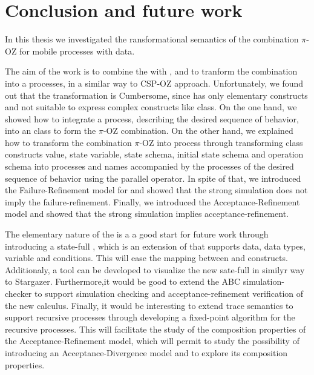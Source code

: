 \chapter{Conclusion and future work}
\label{sec_conclusion}
In this thesis we investigated the ransformational semantics of the combination $\pi$-OZ for mobile processes with data.

The aim of the work is to combine the \oz{} with \picalc{}, and to tranform the combination into a \picalc{} processes, in a similar way to CSP-OZ \cite{olderog} approach. Unfortunately, we found out that the transformation is Cumbersome, since \picalc{} has only elementary constructs and not suitable to express complex constructs like \oz{} class. On the one hand, we showed how to integrate a \picalc{} process, describing the desired sequence of behavior, into an \oz{} class to form the $\pi$-OZ combination. On the other hand, we explained how to transform the combination $\pi$-OZ into \picalc{} process through transforming \oz{} class constructs value, state variable, state schema, initial state schema and operation schema into \picalc{} processes and names accompanied by the processes of the desired sequence of behavior using the parallel operator. In spite of that, we introduced the Failure-Refinement model for \picalc{} and showed that the strong simulation does not imply the failure-refinement. Finally, we introduced the Acceptance-Refinement model and showed that the strong simulation implies acceptance-refinement. 

The elementary nature of the \picalc{} is a a good start for future work through introducing a state-full \picalc{}, which is an extension of \picalc{} that supports data, data types, variable and conditions. This will ease the mapping between \oz{} and \picalc{} constructs. Additionaly, a tool can be developed to visualize the new sate-full \picalc{} in similyr way to Stargazer\cite{stargazer}. Furthermore,it would be good to extend the ABC simulation-checker \cite{abc} to support simulation checking and acceptance-refinement verification of the new calculus. Finally, it would be interesting to extend \cite{gieseking} trace semantics to support recursive processes through developing a fixed-point algorithm for the recursive processes. This will facilitate the study of the composition properties of the Acceptance-Refinement model, which will permit to study the possibility of introducing an Acceptance-Divergence model and to explore its composition properties.
